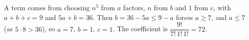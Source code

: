 A term comes from choosing $n^5$ from $a$ factors, $n$ from $b$ and $1$ from $c$, with $a+b+c=9$ and $5a+b=36$. Then $b=36-5a\le9-a$ forces $a\ge7$, and $a\le7$ (as $5\cdot8>36$), so $a=7$, $b=1$, $c=1$. The coefficient is $\dfrac{9!}{7!\,1!\,1!}=\boxed{72}$.
